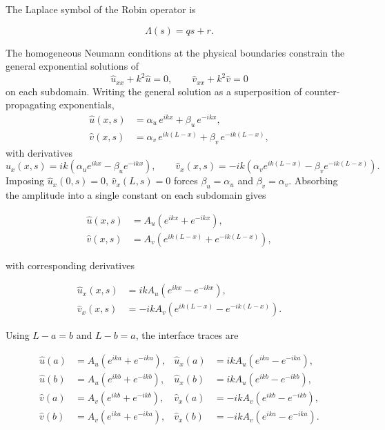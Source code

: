 \documentclass{Configuration_Files/PoliMi3i_thesis}
\begin{document}
The Laplace symbol of the Robin operator is

\begin{equation*}
\Lambda(s)=qs+r.
\end{equation*}

The homogeneous Neumann conditions at the physical boundaries constrain the general exponential solutions of
\[
\widehat{u}_{xx}+k^2\widehat{u}=0,
\qquad
\widehat{v}_{xx}+k^2\widehat{v}=0
\]
on each subdomain. Writing the general solution as a superposition of counter-propagating exponentials,
\begin{align*}
\widehat{u}(x,s) &= \alpha_u\,e^{ikx} + \beta_u\,e^{-ikx}, \\
\widehat{v}(x,s) &= \alpha_v\,e^{ik(L-x)} + \beta_v\,e^{-ik(L-x)},
\end{align*}
with derivatives
\[
\widehat{u}_x(x,s) = ik\left(\alpha_u e^{ikx}-\beta_u e^{-ikx}\right),
\qquad
\widehat{v}_x(x,s) = -ik\left(\alpha_v e^{ik(L-x)}-\beta_v e^{-ik(L-x)}\right).
\]
Imposing $\widehat u_x(0,s)=0$, $\widehat v_x(L,s)=0$ forces $\beta_u=\alpha_u$ and $\beta_v=\alpha_v$. Absorbing the amplitude into a single constant on each subdomain gives

\begin{align*}
\widehat{u}(x,s) &= A_u\left(e^{ikx}+e^{-ikx}\right), \\
\widehat{v}(x,s) &= A_v\left(e^{ik(L-x)}+e^{-ik(L-x)}\right),
\end{align*}

with corresponding derivatives

\begin{align*}
\widehat{u}_x(x,s) &= ikA_u\left(e^{ikx}-e^{-ikx}\right), \\
\widehat{v}_x(x,s) &= -ikA_v\left(e^{ik(L-x)}-e^{-ik(L-x)}\right).
\end{align*}

Using $L-a=b$ and $L-b=a$, the interface traces are

\begin{align*}
\widehat{u}(a) &= A_u\left(e^{ika}+e^{-ika}\right),
&
\widehat{u}_x(a) &= ikA_u\left(e^{ika}-e^{-ika}\right),
\\
\widehat{u}(b) &= A_u\left(e^{ikb}+e^{-ikb}\right),
&
\widehat{u}_x(b) &= ikA_u\left(e^{ikb}-e^{-ikb}\right),
\\
\widehat{v}(a) &= A_v\left(e^{ikb}+e^{-ikb}\right),
&
\widehat{v}_x(a) &= -ikA_v\left(e^{ikb}-e^{-ikb}\right),
\\
\widehat{v}(b) &= A_v\left(e^{ika}+e^{-ika}\right),
&
\widehat{v}_x(b) &= -ikA_v\left(e^{ika}-e^{-ika}\right).
\end{align*}
\end{document}
